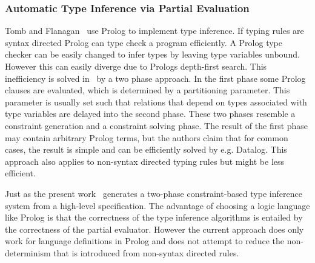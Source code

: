 \subsubsection{Automatic Type Inference via Partial Evaluation}
Tomb and Flanagan~\cite{tomb2005automatic} use Prolog to implement
type inference. If typing rules are syntax directed Prolog can type
check a program efficiently. A Prolog type checker can be easily
changed to infer types by leaving type variables unbound. However this
can easily diverge due to Prologs depth-first search. This
inefficiency is solved in~\cite{tomb2005automatic} by a two phase
approach. In the first phase some Prolog clauses are evaluated, which
is determined by a partitioning parameter. This parameter is usually
set such that relations that depend on types associated with type
variables are delayed into the second phase. These two phases resemble
a constraint generation and a constraint solving phase. The result of
the first phase may contain arbitrary Prolog terms, but the authors
claim that for common cases, the result is simple and can be
efficiently solved by e.g. Datalog. This approach also applies to
non-syntax directed typing rules but might be less efficient.

Just as the present work~\cite{tomb2005automatic} generates a
two-phase constraint-based type inference system from a high-level
specification. The advantage of choosing a logic language like Prolog
is that the correctness of the type inference algorithms is entailed
by the correctness of the partial evaluator. However the current
approach does only work for language definitions in Prolog and does
not attempt to reduce the non-determinism that is introduced from
non-syntax directed rules.

